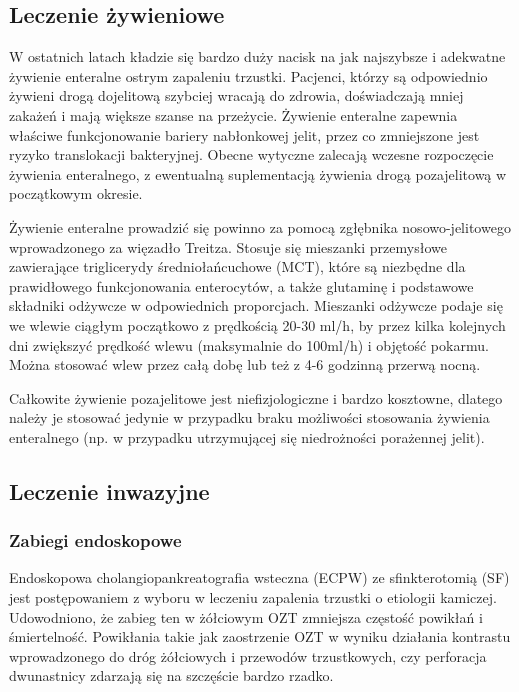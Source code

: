 \documentclass[a4paper, 12pt]{report}
\begin{document}
\subsection{Leczenie żywieniowe}

W ostatnich latach kładzie się bardzo duży nacisk na jak najszybsze i
adekwatne żywienie enteralne ostrym zapaleniu trzustki. Pacjenci,
którzy są odpowiednio żywieni drogą dojelitową szybciej wracają do
zdrowia, doświadczają mniej zakażeń i mają większe szanse na
przeżycie. Żywienie enteralne zapewnia właściwe funkcjonowanie bariery
nabłonkowej jelit, przez co zmniejszone jest ryzyko translokacji
bakteryjnej. Obecne wytyczne zalecają wczesne rozpoczęcie żywienia
enteralnego, z ewentualną suplementacją żywienia drogą pozajelitową w
początkowym okresie. 

Żywienie enteralne prowadzić się powinno za pomocą zgłębnika
nosowo-jelitowego wprowadzonego za więzadło Treitza. Stosuje się
mieszanki przemysłowe zawierające triglicerydy średniołańcuchowe
(MCT), które są niezbędne dla prawidłowego funkcjonowania enterocytów,
a także glutaminę i podstawowe składniki odżywcze w odpowiednich
proporcjach. Mieszanki odżywcze podaje się we wlewie ciągłym
początkowo z prędkością 20-30 ml/h, by przez kilka kolejnych dni
zwiększyć prędkość wlewu (maksymalnie do 100ml/h) i objętość pokarmu.
Można stosować wlew przez całą dobę lub też z 4-6 godzinną przerwą
nocną.

Całkowite żywienie pozajelitowe jest niefizjologiczne i bardzo
kosztowne, dlatego należy je stosować jedynie w przypadku braku
możliwości stosowania żywienia enteralnego (np. w przypadku
utrzymującej się niedrożności porażennej jelit).

\subsection{Leczenie inwazyjne}

\subsubsection{Zabiegi endoskopowe}

Endoskopowa cholangiopankreatografia wsteczna (ECPW) ze sfinkterotomią
(SF) jest postępowaniem z wyboru w leczeniu zapalenia trzustki o
etiologii kamiczej. Udowodniono, że zabieg ten w żółciowym OZT
zmniejsza częstość powikłań i śmiertelność. Powikłania takie jak
zaostrzenie OZT w wyniku działania kontrastu wprowadzonego do dróg
żółciowych i przewodów trzustkowych, czy perforacja dwunastnicy
zdarzają się na szczęście bardzo rzadko.
\end{document}
